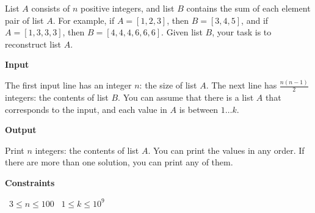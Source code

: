 List $A$ consists of $n$ positive integers, and list $B$ contains the sum of each element pair of list $A$.
For example, if $A=[1,2,3]$, then $B=[3,4,5]$, and if $A=[1,3,3,3]$, then $B=[4,4,4,6,6,6]$.
Given list $B$, your task is to reconstruct list $A$.

\vspace{0.3cm}\noindent\textbf{Input}

The first input line has an integer $n$: the size of list $A$.
The next line has $\frac{n(n-1)}{2}$ integers: the contents of list $B$.
You can assume that there is a list $A$ that corresponds to the input, and each value in $A$ is between $1 \dots k$.

\vspace{0.3cm}\noindent\textbf{Output}

Print $n$ integers: the contents of list $A$.
You can print the values in any order. If there are more than one solution, you can print any of them.

\vspace{0.3cm}\noindent\textbf{Constraints}

\textbullet\ $3 \le n \le 100$
\textbullet\ $1 \le k \le 10^9$